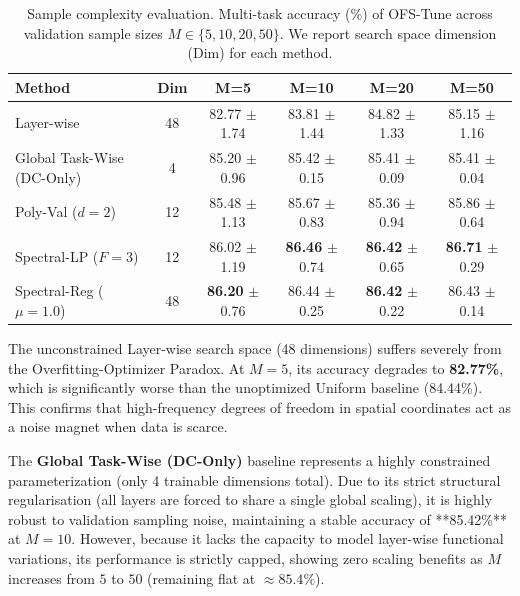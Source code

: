 \begin{table}[t]
\caption{Sample complexity evaluation. Multi-task accuracy (\%) of OFS-Tune across validation sample sizes $M \in \{5, 10, 20, 50\}$. We report search space dimension (Dim) for each method.}
\label{tab:sample_complexity}
\vskip 0.15in
\begin{center}
\begin{small}
\begin{sc}
\begin{tabular}{lccccc}
\toprule
Method & Dim & M=5 & M=10 & M=20 & M=50 \\
\midrule
Layer-wise & 48 & 82.77 $\pm$ 1.74 & 83.81 $\pm$ 1.44 & 84.82 $\pm$ 1.33 & 85.15 $\pm$ 1.16 \\
Global Task-Wise (DC-Only) & 4 & 85.20 $\pm$ 0.96 & 85.42 $\pm$ 0.15 & 85.41 $\pm$ 0.09 & 85.41 $\pm$ 0.04 \\
Poly-Val ($d=2$) & 12 & 85.48 $\pm$ 1.13 & 85.67 $\pm$ 0.83 & 85.36 $\pm$ 0.94 & 85.86 $\pm$ 0.64 \\
\midrule
Spectral-LP ($F=3$) & 12 & 86.02 $\pm$ 1.19 & \textbf{86.46} $\pm$ 0.74 & \textbf{86.42} $\pm$ 0.65 & \textbf{86.71} $\pm$ 0.29 \\
Spectral-Reg ($\mu=1.0$) & 48 & \textbf{86.20} $\pm$ 0.76 & 86.44 $\pm$ 0.25 & \textbf{86.42} $\pm$ 0.22 & 86.43 $\pm$ 0.14 \\
\bottomrule
\end{tabular}
\end{sc}
\end{small}
\end{center}
\vskip -0.1in
\end{table}

The unconstrained Layer-wise search space (48 dimensions) suffers severely from the Overfitting-Optimizer Paradox. At $M=5$, its accuracy degrades to \textbf{82.77\%}, which is significantly worse than the unoptimized Uniform baseline (84.44\%). This confirms that high-frequency degrees of freedom in spatial coordinates act as a noise magnet when data is scarce.

The \textbf{Global Task-Wise (DC-Only)} baseline represents a highly constrained parameterization (only 4 trainable dimensions total). Due to its strict structural regularisation (all layers are forced to share a single global scaling), it is highly robust to validation sampling noise, maintaining a stable accuracy of **85.42\%** at $M=10$. However, because it lacks the capacity to model layer-wise functional variations, its performance is strictly capped, showing zero scaling benefits as $M$ increases from $5$ to $50$ (remaining flat at $\approx 85.4\%$).

